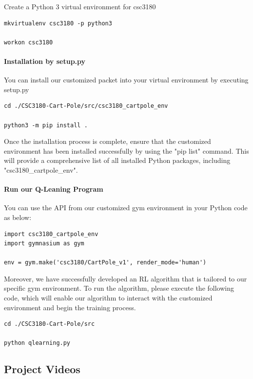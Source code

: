 \documentclass[10pt,a4paper]{article}
\begin{document}
Create a Python 3 virtual environment for csc3180

\begin{lstlisting}[caption={Create a Virtual-Env}]
mkvirtualenv csc3180 -p python3

workon csc3180
\end{lstlisting}


\paragraph{Installation by setup.py}

You can install our customized packet into your virtual environment by executing setup.py

\begin{lstlisting}[caption={To use setup.py to install our env packet}]
cd ./CSC3180-Cart-Pole/src/csc3180_cartpole_env

python3 -m pip install .
\end{lstlisting}

Once the installation process is complete, ensure that the customized environment has been installed successfully by using the "pip list" command. This will provide a comprehensive list of all installed Python packages, including  "csc3180\_cartpole\_env".


\paragraph{Run our Q-Leaning Program}
You can use the API from our customized gym environment in your Python code as below:
\begin{lstlisting}[caption={use the customized environment in python}]
import csc3180_cartpole_env
import gymnasium as gym

env = gym.make('csc3180/CartPole_v1', render_mode='human')
\end{lstlisting}

Moreover, we have successfully developed an RL algorithm that is tailored to our specific gym environment. To run the algorithm, please execute the following code, which will enable our algorithm to interact with the customized environment and begin the training process.

\begin{lstlisting}[caption={To use setup.py to install our env packet}]
cd ./CSC3180-Cart-Pole/src

python qlearning.py
\end{lstlisting}
\subsection{Project Videos}
\end{document}
